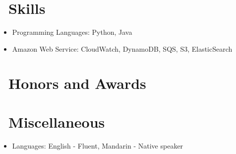 \documentclass{resume}
\begin{document}
\section{\faCogs\ Skills}
\begin{itemize}[parsep=0.5ex]
  \item Programming Languages: Python, Java
  \item Amazon Web Service: CloudWatch, DynamoDB, SQS, S3, ElasticSearch
\end{itemize}

\section{\faHeartO\ Honors and Awards}

\section{\faInfo\ Miscellaneous}
\begin{itemize}[parsep=0.5ex]
  \item Languages: English - Fluent, Mandarin - Native speaker
\end{itemize}
\end{document}
